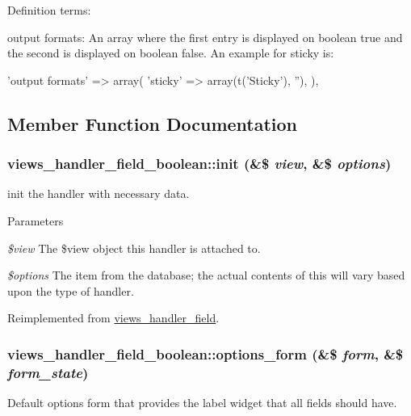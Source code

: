 Definition terms:
\begin{DoxyItemize}
\item output formats: An array where the first entry is displayed on boolean true and the second is displayed on boolean false. An example for sticky is: 
\begin{DoxyCode}
      'output formats' => array(
        'sticky' => array(t('Sticky'), ''),
      ),
\end{DoxyCode}
 
\end{DoxyItemize}

\subsection{Member Function Documentation}
\hypertarget{classviews__handler__field__boolean_aaf7acd5dcd7831d32a3977f5211230fb}{
\subsubsection[{init}]{\setlength{\rightskip}{0pt plus 5cm}views\_\-handler\_\-field\_\-boolean::init (\&\$ {\em view}, \/  \&\$ {\em options})}}
\label{classviews__handler__field__boolean_aaf7acd5dcd7831d32a3977f5211230fb}
init the handler with necessary data. 
\begin{DoxyParams}{Parameters}
\item[{\em \$view}]The \$view object this handler is attached to. \item[{\em \$options}]The item from the database; the actual contents of this will vary based upon the type of handler. \end{DoxyParams}


Reimplemented from \hyperlink{classviews__handler__field_a3a290c7df3ead81e5cd244ad5335b1cc}{views\_\-handler\_\-field}.\hypertarget{classviews__handler__field__boolean_a3addce6b85348a630627f348907082e3}{
\subsubsection[{options\_\-form}]{\setlength{\rightskip}{0pt plus 5cm}views\_\-handler\_\-field\_\-boolean::options\_\-form (\&\$ {\em form}, \/  \&\$ {\em form\_\-state})}}
\label{classviews__handler__field__boolean_a3addce6b85348a630627f348907082e3}
Default options form that provides the label widget that all fields should have. 


